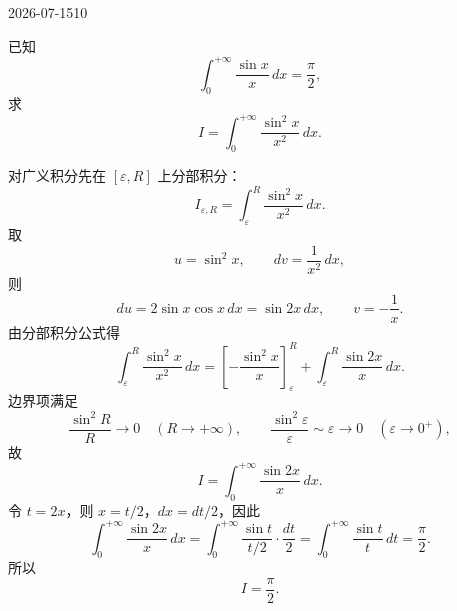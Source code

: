 \begin{mistake}{2026-07-15}{10}

\begin{problemcontent}
已知
\[
\int_0^{+\infty}\frac{\sin x}{x}\,dx=\frac{\pi}{2},
\]
求
\[
I=\int_0^{+\infty}\frac{\sin^2 x}{x^2}\,dx.
\]
\end{problemcontent}

\begin{solutioncontent}
对广义积分先在 \([\varepsilon,R]\) 上分部积分：
\[
I_{\varepsilon,R}=\int_{\varepsilon}^{R}\frac{\sin^2 x}{x^2}\,dx.
\]
取
\[
u=\sin^2 x,\qquad dv=\frac{1}{x^2}\,dx,
\]
则
\[
du=2\sin x\cos x\,dx=\sin 2x\,dx,\qquad v=-\frac{1}{x}.
\]
由分部积分公式得
\[
\int_{\varepsilon}^{R}\frac{\sin^2 x}{x^2}\,dx
=
\left[-\frac{\sin^2 x}{x}\right]_{\varepsilon}^{R}
+
\int_{\varepsilon}^{R}\frac{\sin 2x}{x}\,dx.
\]
边界项满足
\[
\frac{\sin^2 R}{R}\to0\quad(R\to+\infty),
\qquad
\frac{\sin^2\varepsilon}{\varepsilon}\sim \varepsilon\to0\quad(\varepsilon\to0^+),
\]
故
\[
I=\int_0^{+\infty}\frac{\sin 2x}{x}\,dx.
\]
令 \(t=2x\)，则 \(x=t/2\)，\(dx=dt/2\)，因此
\[
\int_0^{+\infty}\frac{\sin 2x}{x}\,dx
=
\int_0^{+\infty}\frac{\sin t}{t/2}\cdot\frac{dt}{2}
=
\int_0^{+\infty}\frac{\sin t}{t}\,dt
=\frac{\pi}{2}.
\]
所以
\[
I=\frac{\pi}{2}.
\]
\end{solutioncontent}


\end{mistake}
